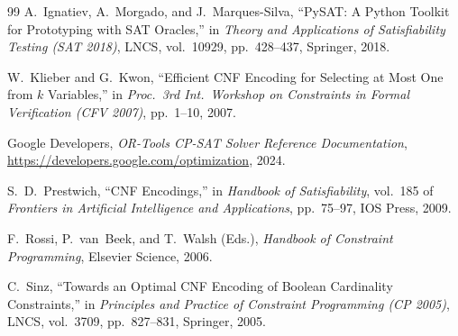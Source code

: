 \documentclass[a4paper,fleqn]{cas-sc}
\begin{document}
\begin{thebibliography}{99}
A.~Ignatiev, A.~Morgado, and J.~Marques-Silva,
``PySAT: A Python Toolkit for Prototyping with SAT Oracles,''
in \textit{Theory and Applications of Satisfiability Testing (SAT 2018)},
LNCS, vol.~10929, pp.~428--437, Springer, 2018.

W.~Klieber and G.~Kwon,
``Efficient CNF Encoding for Selecting at Most One from $k$ Variables,''
in \textit{Proc.\ 3rd Int.\ Workshop on Constraints in Formal Verification (CFV 2007)},
pp.~1--10, 2007.

Google Developers,
\textit{OR-Tools CP-SAT Solver Reference Documentation},
\url{https://developers.google.com/optimization}, 2024.

S.~D.~Prestwich,
``CNF Encodings,''
in \textit{Handbook of Satisfiability},
vol.~185 of \textit{Frontiers in Artificial Intelligence and Applications}, pp.~75--97, IOS Press, 2009.

F.~Rossi, P.~van~Beek, and T.~Walsh (Eds.),
\textit{Handbook of Constraint Programming},
Elsevier Science, 2006.

C.~Sinz,
``Towards an Optimal CNF Encoding of Boolean Cardinality Constraints,''
in \textit{Principles and Practice of Constraint Programming (CP 2005)},
LNCS, vol.~3709, pp.~827--831, Springer, 2005.

\end{thebibliography}
\end{document}
